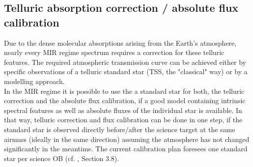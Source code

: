 
\subsection{Telluric absorption correction / absolute flux calibration}\label{ssec:tellcorr}
Due to the dense molecular absorptions arising from the Earth's atmosphere, nearly every \ac{MIR} regime spectrum requires a correction for these telluric features. The required atmospheric transmission curve can be achieved either by specific observations of a telluric standard star (\ac{TSS}, the "classical" way) or by a modelling approach.\\
In the \ac{MIR} regime it is possible to use the a standard star for both, the telluric correction and the absolute flux calibration, if a good model containing intrinsic spectral features as well as absolute fluxes of the individual star is available. In that way, telluric correction and flux calibration can be done in one step, if the standard star is observed directly before/after the science target at the same airmass (ideally in the same direction) assuming the atmosphere has not changed significantly in the meantime. The current calibration plan foresees one standard star per science \ac{OB} (cf. \cite{METIS-calibration_plan}, Section 3.8). \\
